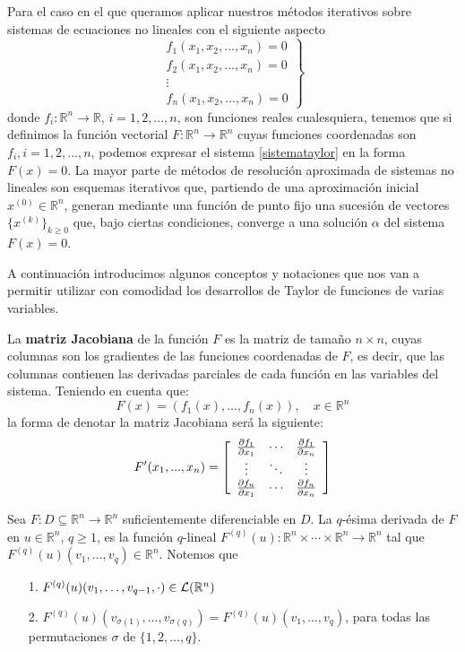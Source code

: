 Para el caso en el que queramos aplicar nuestros métodos iterativos sobre sistemas de ecuaciones no lineales con el siguiente aspecto
\begin{equation}\label{sistemataylor}
	\left.
	\begin{array}{c}
		f_1(x_1,x_2,...,x_n)=0\\
		f_2(x_1,x_2,...,x_n)=0\\
		\vdots\\
		f_n(x_1,x_2,...,x_n)=0
	\end{array}
	\right\}
\end{equation}
donde $f_i : \mathbb{R}^n \to \mathbb{R}$, $i=1,2,...,n$, son funciones reales cualesquiera, tenemos que si definimos la función vectorial $F : \mathbb{R}^n \to \mathbb{R}^n$ cuyas funciones coordenadas son $f_i, i=1,2,...,n$, podemos expresar el sistema \eqref{sistemataylor} en la forma $F(x)=0$.
La mayor parte de métodos de resolución aproximada de sistemas no lineales son esquemas iterativos que, partiendo de una aproximación inicial $x^{(0)} \in \mathbb{R}^n$, generan mediante una función de punto fijo una sucesión de vectores $\{x^{(k)}\}_{k\geq 0}$ que, bajo ciertas condiciones, converge a una solución $\alpha$ del sistema $F(x)=0$.

A continuación introducimos algunos conceptos y notaciones que nos van a permitir utilizar con comodidad los desarrollos de Taylor de funciones de varias variables.

La \textbf{matriz Jacobiana} de la función $F$ es la matriz de tamaño $n \times n$, cuyas columnas son los gradientes de las funciones coordenadas de $F$, es decir, que las columnas contienen las derivadas parciales de cada función en las variables del sistema. Teniendo en cuenta que:
\[
F(x)=(f_1(x),...,f_n(x)), \quad x \in \mathbb{R}^n
\]
la forma de denotar la matriz Jacobiana será la siguiente:
\[
F'(x_1,...,x_n)=\left[ {\begin{array}{*{20}c}
	\frac{\partial f_1}{\partial x_1}&\cdots&\frac{\partial f_1}{\partial x_n}\\
	\vdots&\ddots&\vdots\\
	\frac{\partial f_n}{\partial x_1}&\cdots&\frac{\partial f_n}{\partial x_n}
	\end{array} } \right]
\]

Sea $F: D\subseteq \mathbb{R}^{n} \longrightarrow \mathbb{R}^{n}$ suficientemente diferenciable en $D$. La $q$-ésima derivada de $F$ en
$u \in \mathbb{R}^{n}$, $q \geq 1$, es la función $q$-lineal
$F^{(q)}(u): \mathbb{R}^{n} \times \cdots \times \mathbb{R}^{n}
\longrightarrow \mathbb{R}^{n}$ tal que $F^{(q)}(u)(v_1,\ldots,v_q) \in \mathbb{R}^{n}$.
Notemos que
\begin{itemize}
	\item [1.]  $F^{(q)}(u)(v_1,\ldots,v_{q-1}, \cdot) \in {\cal L}(\mathbb{R}^{n})$
	\item [2.]  $F^{(q)}(u)(v_{\sigma(1)},\ldots,v_{\sigma (q)})=
	F^{(q)}(u)(v_1,\ldots,v_q)$, para todas las permutaciones $\sigma$ de $\{1,2,\ldots,q\}$.
\end{itemize}

